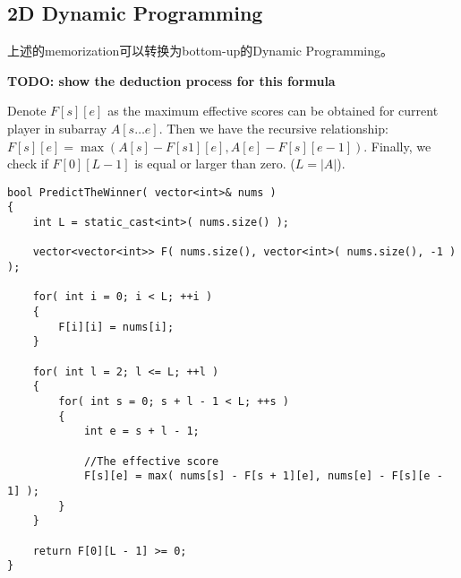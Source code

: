\subsection{2D Dynamic Programming}
上述的memorization可以转换为bottom-up的Dynamic Programming。

\textbf{TODO: show the deduction process for this formula}

Denote $F[s][e]$ as the maximum effective scores can be obtained for current player in subarray $A[s\ldots e]$. Then we have the recursive relationship: $F[s][e] = \max(A[s] - F[s1][e], A[e] - F[s][e-1])$. Finally, we check if $F[0][L-1]$ is equal or larger than zero. ($L=\lvert A\rvert$).


\setcounter{lstlisting}{0}
\begin{lstlisting}[style=customc, caption={2D Dynamic Programming}]
bool PredictTheWinner( vector<int>& nums )
{
    int L = static_cast<int>( nums.size() );

    vector<vector<int>> F( nums.size(), vector<int>( nums.size(), -1 ) );

    for( int i = 0; i < L; ++i )
    {
        F[i][i] = nums[i];
    }

    for( int l = 2; l <= L; ++l )
    {
        for( int s = 0; s + l - 1 < L; ++s )
        {
            int e = s + l - 1;

            //The effective score
            F[s][e] = max( nums[s] - F[s + 1][e], nums[e] - F[s][e - 1] );
        }
    }

    return F[0][L - 1] >= 0;
}

\end{lstlisting}
